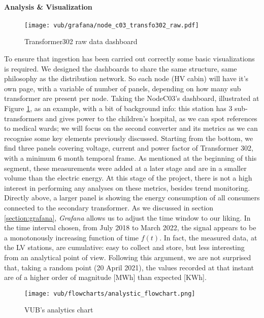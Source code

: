 \paragraph{Analysis \& Visualization}
\begin{figure}[ht]
    \texttt{[image: vub/grafana/node\_c03\_transfo302\_raw.pdf]}
    \caption{Transformer302 raw data dashboard}
    \label{fig:vub_raw_rad}
\end{figure}
To ensure that ingestion has been carried out correctly some basic visualizations is required.
We designed the dashboards to share the same structure, same philosophy as the distribution network.
So each node (\ac{HV} cabin) will have it's own page, with a variable of number of panels, depending on how many sub transformer are present per node.
Taking the NodeC03's dashboard, illustrated at Figure \ref{fig:vub_raw_rad}, as an example, with a bit of background info: 
this station has 3 sub-transformers and gives power to the children's hospital, as we can spot references to medical wards; 
we will focus on the second converter and its metrics as we can recognise some key elements previously discussed.
Starting from the bottom, we find three panels covering voltage, current and power factor of Transformer 302, with a minimum 6 month temporal frame.
As mentioned at the beginning of this segment, these measurements were added at a later stage and are in a smaller volume than the electric energy. 
At this stage of the project, there is not a high interest in performing any analyses on these metrics, besides trend monitoring. 
Directly above, a larger panel is showing the energy consumption of all consumers connected to the secondary transformer.
As we discussed in section \ref{section:grafana}, \textit{Grafana} allows us to adjust the time window to our liking.
In the time interval chosen, from July 2018 to March 2022, the signal appears to be a monotonously increasing function of time $f(t)$. 
In fact, the measured data, at the \ac{LV} stations, are cumulative: easy to collect and store, but less interesting from an analytical point of view. 
Following this argument, we are not surprised that, taking a random point (20 April 2021), the values recorded at that instant are of a higher order of magnitude [MWh] than expected [KWh].
\begin{figure}[ht]
    \texttt{[image: vub/flowcharts/analystic\_flowchart.png]}
    \caption{\ac{VUB}'s analytics chart}
    \label{fig:vub_anal_chart}
\end{figure}

